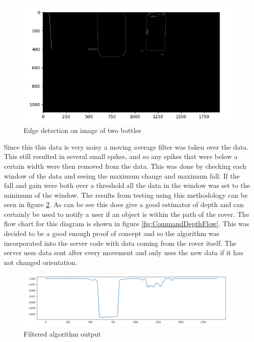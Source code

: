 \documentclass[10pt,twoside]{article}
\begin{document}
\begin{figure}[hbt]
    \centering
    \includegraphics[scale = 0.6]{Commandbottles.png}
    \caption{Edge detection on image of two bottles}
    \label{fig:Commandbottles}
\end{figure}

Since this this data is very noisy a moving average filter was taken over the data. This still resulted in several small spikes, and so any spikes that were below a certain width were then removed from the data. This was done by checking each window of the data and seeing the maximum change and maximum fall. If the fall and gain were both over a threshold all the data in the window was set to the minimum of the window. The results from testing using this methodology can be seen in figure \ref{fig:CommandFilteredDepth}. As can be see this does give a good estimator of depth and can certainly be used to notify a user if an object is within the path of the rover. The flow chart for this diagram is shown in figure \ref{fig:CommandDepthFlow}. This was decided to be a good enough proof of concept and so the algorithm was incorporated into the server code with data coming from the rover itself. The server uses data sent after every movement and only uses the new data if it has not changed orientation. 

\begin{figure}[hbt]
    \centering
    \includegraphics[scale = 0.4]{CommandFiltered.png}
    \caption{Filtered algorithm output}
    \label{fig:CommandFilteredDepth}
\end{figure}
\end{document}
